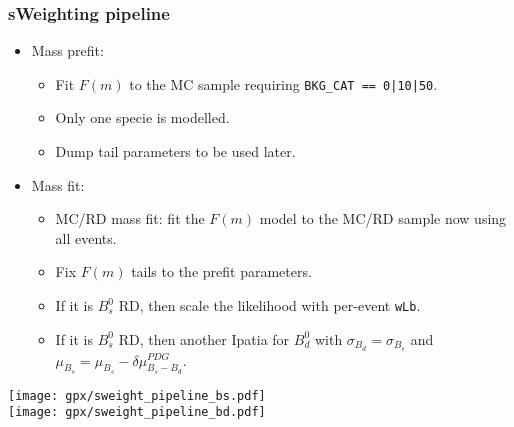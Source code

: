 \documentclass[9pt,aspectratio=43]{beamer}
\begin{document}
%
\begin{frame}[default]
\frametitle{sWeighting pipeline}

\begin{itemize}
  \item Mass prefit:
    \begin{itemize}
       \item Fit $F(m)$ to the MC sample requiring \texttt{BKG\_CAT == 0|10|50}.
       \item Only one specie is modelled. 
       \item Dump tail parameters to be used later.
    \end{itemize}
  \item Mass fit:
    \begin{itemize}
      \item MC/RD mass fit: fit the $F(m)$ model to the MC/RD sample now using all events.
      \item Fix $F(m)$ tails to the prefit parameters.
      \item If it is $B_s^0$ RD, then scale the likelihood with per-event \texttt{wLb}.
      \item If it is $B_s^0$ RD, then another Ipatia for $B_d^0$ with $\sigma_{B_d}=\sigma_{B_s}$ and $\mu_{B_s}=\mu_{B_s}-\delta\mu_{B_s-B_d}^{PDG}$.
    \end{itemize}
\end{itemize}

\begin{center}
  \texttt{[image: gpx/sweight\_pipeline\_bs.pdf]}\\
  \vspace*{5mm}
  \texttt{[image: gpx/sweight\_pipeline\_bd.pdf]}
\end{center}

\end{frame}
%
\end{document}
